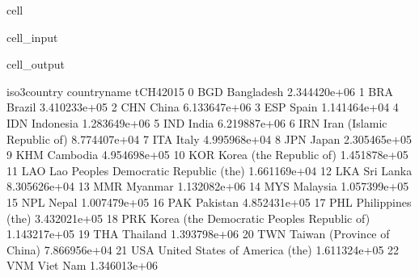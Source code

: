 \documentclass[letterpaper,10pt,english]{jupyterBook}
\begin{document}
\begin{sphinxuseclass}{cell}\begin{sphinxVerbatimInput}

\begin{sphinxuseclass}{cell_input}
\begin{sphinxVerbatim}[commandchars=\\\{\}]
\end{sphinxVerbatim}

\end{sphinxuseclass}\end{sphinxVerbatimInput}
\begin{sphinxVerbatimOutput}

\begin{sphinxuseclass}{cell_output}
\begin{sphinxVerbatim}[commandchars=\\\{\}]
   iso3\PYGZus{}country                                 country\PYGZus{}name     tCH4\PYGZus{}2015  \PYGZbs{}
0           BGD                                   Bangladesh  2.344420e+06   
1           BRA                                       Brazil  3.410233e+05   
2           CHN                                        China  6.133647e+06   
3           ESP                                        Spain  1.141464e+04   
4           IDN                                    Indonesia  1.283649e+06   
5           IND                                        India  6.219887e+06   
6           IRN                   Iran (Islamic Republic of)  8.774407e+04   
7           ITA                                        Italy  4.995968e+04   
8           JPN                                        Japan  2.305465e+05   
9           KHM                                     Cambodia  4.954698e+05   
10          KOR                      Korea (the Republic of)  1.451878e+05   
11          LAO       Lao People\PYGZsq{}s Democratic Republic (the)  1.661169e+04   
12          LKA                                    Sri Lanka  8.305626e+04   
13          MMR                                      Myanmar  1.132082e+06   
14          MYS                                     Malaysia  1.057399e+05   
15          NPL                                        Nepal  1.007479e+05   
16          PAK                                     Pakistan  4.852431e+05   
17          PHL                            Philippines (the)  3.432021e+05   
18          PRK  Korea (the Democratic People\PYGZsq{}s Republic of)  1.143217e+05   
19          THA                                     Thailand  1.393798e+06   
20          TWN                   Taiwan (Province of China)  7.866956e+04   
21          USA               United States of America (the)  1.611324e+05   
22          VNM                                     Viet Nam  1.346013e+06   


\end{sphinxVerbatim}
\end{sphinxuseclass}
\end{sphinxVerbatimOutput}
\end{sphinxuseclass}
\end{document}
